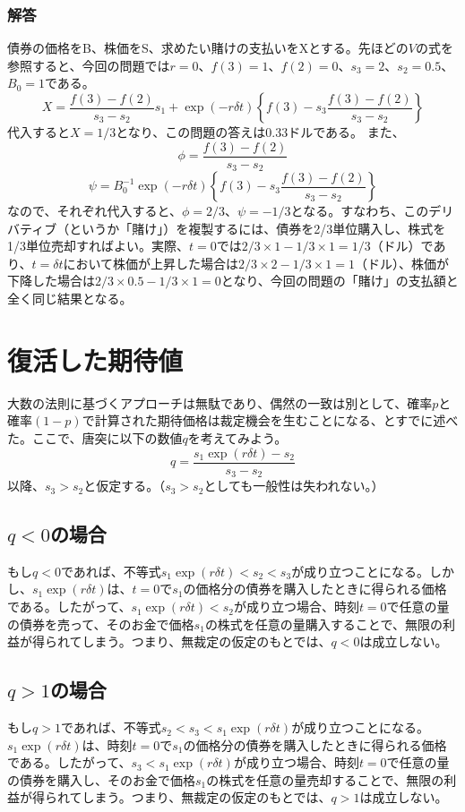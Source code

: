 \documentclass[uplatex,a4j,12pt,dvipdfmx]{jsarticle}
\begin{document}
\subsubsection{解答}
債券の価格をB、株価をS、求めたい賭けの支払いをXとする。先ほどの$V$の式を参照すると、今回の問題では$r=0$、$f(3)=1$、$f(2)=0$、$s_3=2$、$s_2=0.5$、$B_0=1$である。
\[X = \frac{f(3) - f(2)}{s_3 - s_2} s_1 + \exp(-r\delta t) \left\{ f(3) - s_3 \frac{f(3) - f(2)}{s_3 - s_2} \right\}\]
代入すると$X = 1/3$となり、この問題の答えは0.33ドルである。
また、
\[\phi = \frac{f(3) - f(2)}{s_3 - s_2}\]
\[\psi = B_0^{-1} \exp(-r\delta t) \left\{ f(3) - s_3 \frac{f(3) - f(2)}{s_3 - s_2} \right\}\]
なので、それぞれ代入すると、$\phi =2/3$、$\psi=-1/3$となる。すなわち、このデリバティブ（というか「賭け」）を複製するには、債券を2/3単位購入し、株式を1/3単位売却すればよい。実際、$t=0$では$2/3 \times 1 - 1/3 \times 1 = 1/3$（ドル）であり、$t=\delta t$において株価が上昇した場合は$2/3 \times 2 - 1/3 \times 1 = 1$（ドル）、株価が下降した場合は$2/3 \times 0.5 - 1/3 \times 1 = 0$となり、今回の問題の「賭け」の支払額と全く同じ結果となる。

\section{復活した期待値}
大数の法則に基づくアプローチは無駄であり、偶然の一致は別として、確率$p$と確率$(1-p)$で計算された期待価格は裁定機会を生むことになる、とすでに述べた。ここで、唐突に以下の数値$q$を考えてみよう。
\[q = \frac{s_1 \exp(r\delta t) - s_2}{s_3 - s_2}\]
以降、$s_3 > s_2$と仮定する。（$s_3 > s_2$としても一般性は失われない。）

\subsection{$q < 0$の場合}
もし$q<0$であれば、不等式$s_1 \exp(r\delta t) < s_2 < s_3$が成り立つことになる。しかし、$s_1 \exp(r\delta t)$は、$t=0$で$s_1$の価格分の債券を購入したときに得られる価格である。したがって、$s_1 \exp(r\delta t) < s_2$が成り立つ場合、時刻$t=0$で任意の量の債券を売って、そのお金で価格$s_1$の株式を任意の量購入することで、無限の利益が得られてしまう。つまり、無裁定の仮定のもとでは、$q<0$は成立しない。

\subsection{$q > 1$の場合}
もし$q>1$であれば、不等式$s_2 < s_3 < s_1 \exp(r\delta t)$が成り立つことになる。$s_1 \exp(r\delta t)$は、時刻$t=0$で$s_1$の価格分の債券を購入したときに得られる価格である。したがって、$s_3 < s_1 \exp(r\delta t)$が成り立つ場合、時刻$t=0$で任意の量の債券を購入し、そのお金で価格$s_1$の株式を任意の量売却することで、無限の利益が得られてしまう。つまり、無裁定の仮定のもとでは、$q>1$は成立しない。
\end{document}
